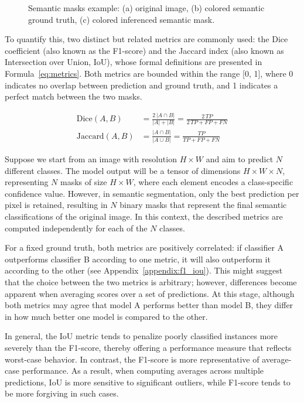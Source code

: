 \begin{figure}[htbp]
    \caption{Semantic masks example: (a) original image, (b) colored semantic ground truth, (c) colored inferenced semantic mask.}
    \label{fig:semantic_masks}
\end{figure}

To quantify this, two distinct but related metrics are commonly used: the Dice coefficient (also known as the F1-score) and the Jaccard index (also known as Intersection over Union, IoU), whose formal definitions are presented in Formula~\ref{eq:metrics}. Both metrics are bounded within the range [0, 1], where 0 indicates no overlap between prediction and ground truth, and 1 indicates a perfect match between the two masks.

\begin{equation}
    \begin{aligned}
    \text{Dice}(A, B) &= \frac{2\,|A \cap B|}{|A| + |B|} = \frac{2\,TP}{2\,TP + FP + FN} \\
    \text{Jaccard}(A, B)  &= \frac{|A \cap B|}{|A \cup B|} = \frac{TP}{TP + FP + FN}
    \end{aligned}
    \label{eq:metrics}
\end{equation}

Suppose we start from an image with resolution $H \times W$ and aim to predict $N$ different classes. The model output will be a tensor of dimensions $H \times W \times N$, representing $N$ masks of size $H \times W$, where each element encodes a class-specific confidence value. However, in semantic segmentation, only the best prediction per pixel is retained, resulting in $N$ binary masks that represent the final semantic classifications of the original image. In this context, the described metrics are computed independently for each of the $N$ classes.

For a fixed ground truth, both metrics are positively correlated: if classifier A outperforms classifier B according to one metric, it will also outperform it according to the other (see Appendix~\ref{appendix:f1_iou}). This might suggest that the choice between the two metrics is arbitrary; however, differences become apparent when averaging scores over a set of predictions. At this stage, although both metrics may agree that model A performs better than model B, they differ in how much better one model is compared to the other.

In general, the IoU metric tends to penalize poorly classified instances more severely than the F1-score, thereby offering a performance measure that reflects worst-case behavior. In contrast, the F1-score is more representative of average-case performance. As a result, when computing averages across multiple predictions, IoU is more sensitive to significant outliers, while F1-score tends to be more forgiving in such cases.

